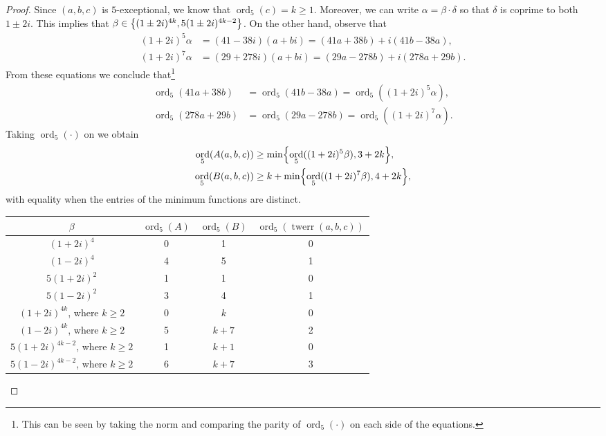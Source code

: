 \documentclass[12pt]{amsart}
\numberwithin{equation}{section} %
\theoremstyle{definition} \newtheorem{definition}[counter]{Definition}
\theoremstyle{remark} \newtheorem{nonexam}[counter]{Non-example}
\newcommand{\brk}[1]{\left\lbrace #1 \right\rbrace} %
\let\originalleft\left \let\originalright\right
\renewcommand{\left}{\mathopen{}\mathclose\bgroup\originalleft}
\renewcommand{\right}{\aftergroup\egroup\originalright}
\DeclareMathOperator{\ord}{ord} %
\DeclareMathOperator{\twerr}{twerr} %
\begin{document}
\begin{proof}
  Since $(a,b,c)$ is $5$-exceptional, we know that $\ord_5(c) = k \geq 1$.
  Moreover, we can write $\alpha = \beta\cdot \delta$ so that $\delta$ is
  coprime to both $1\pm 2i$. This implies that $\beta \in \brk{(1\pm 2i)^{4k},
    5(1\pm 2i)^{4k-2}}$. On the other hand, observe that
  \begin{align*}
        (1+2i)^5  \alpha &= (41-38i)(a+bi) = (41a + 38b) + i(41b - 38a), \\
        (1+2i)^7  \alpha &= (29+278i)(a+bi) = (29a -278b) + i(278a + 29b).
  \end{align*}
  From these equations we conclude that\footnote{This can be seen by taking the
    norm and comparing the parity of $\ord_5(\cdot)$ on each side of the
    equations.}
  \begin{align*}
    \ord_5(41a + 38b) &= \ord_5(41b - 38a) = \ord_5((1+2i)^5\alpha), \\
    \ord_5(278a + 29b) &= \ord_5(29a -278b) = \ord_5((1+2i)^7\alpha).
  \end{align*}
  Taking $\ord_5(\cdot)$ on  we obtain
  \begin{align}
    \label{eq:ord-5-A}
    \ord_5(A(a,b,c)) &\geq \min\brk{\ord_5((1+2i)^5\beta), 3+2k}, \\
    \label{eq:ord-5-B}
    \ord_5(B(a,b,c)) &\geq k + \min\brk{\ord_5((1+2i)^7\beta), 4+2k},
  \end{align}
  with equality when the entries of the minimum functions are distinct.

  \begin{table}[ht]
    \begin{tabular}{|c|c|c|c|}
      \hline
      $\beta$          & $\ord_5(A)$ & $\ord_5(B)$ & $\ord_5(\twerr(a,b,c))$ \\ \hline
      $(1+2i)^4$       & 0           & 1           & 0                        \\ \hline
      $(1-2i)^4$       & 4           & 5           & 1                        \\ \hline
      $5(1+2i)^2$      & 1           & 1           & 0                        \\ \hline
      $5(1-2i)^2$      & 3           & 4           & 1                        \\ \hline
      $(1+2i)^{4k}$, where $k \geq 2$   & 0           & $k$           & 0                        \\ \hline
      $(1-2i)^{4k}$, where $k \geq 2$   & 5           & $k+7$         & 2                        \\ \hline
      $5(1+2i)^{4k-2}$, where $k \geq 2$ & 1          & $k+1$         & 0                        \\ \hline
      $5(1-2i)^{4k-2}$, where $k \geq 2$ & 6          & $k+7$         & 3                        \\ \hline
    \end{tabular}
  \end{table}
\end{proof}
  
\end{document}
